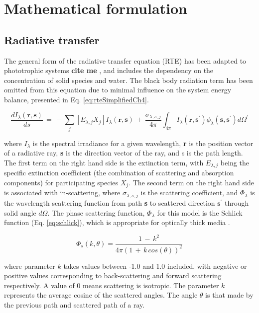 
\newpage
\section{Mathematical formulation}
\label{S:formulation}
\subsection{Radiative transfer}
The general form of the radiative transfer equation (RTE) has been adapted to phototrophic systems \textbf{cite me} \cite{kong2014}, and includes the dependency on the concentration of solid species and water. The black body radiation term has been omitted from this equation due to minimal influence on the system energy balance, presented in Eq. \eqref{eq:rteSimplifiedCh4}. 

\begin{equation}
\frac{dI_\lambda (\textbf{r}, \textbf{s})}{ds} \, = \, - \sum_{j} [E_{\lambda,j} X_j] I_\lambda (\textbf{r}, \textbf{s})\, +\, \frac{\sigma_{\lambda, s, j}}{4 \pi} \int_{4 \pi} I_\lambda (\textbf{r}, \textbf{s}^\prime) \phi_\lambda(\textbf{s}, \textbf{s}^\prime) d\Omega^\prime
\label{eq:rteSimplifiedCh4}
    \end{equation}

where $I_\lambda$ is the spectral irradiance for a given wavelength, \textbf{r} is the position vector of a radiative ray, \textbf{s} is the direction vector of the ray, and s is the path length. The first term on the right hand side is the extinction term, with $E_{\lambda, j}$ being the specific extinction coefficient (the combination of scattering and absorption components) for participating species $X_j$. The second term on the right hand side is associated with in-scattering, where $\sigma_{\lambda, s, j}$ is the scattering coefficient, and $\Phi_\lambda$ is the wavelength scattering function from path \textbf{s} to scattered direction $\textbf{s}^\prime$ through solid angle $d\Omega$. The phase scattering function, $\Phi_\lambda$ for this model is the Schlick function (Eq. \ref{eq:schlick}), which is appropriate for optically thick media \cite{jarosz2008}. 

\begin{equation}
\Phi_s(k, \theta) = \frac{1 \, -\,  k^2}{4\pi (1\, +\,k\, cos(\theta))^2 }
\end{equation}

where parameter $k$ takes values between -1.0 and 1.0 included, with negative or positive values corresponding to back-scattering and forward scattering respectively. A value of 0 means scattering is isotropic. The parameter $k$ represents the average cosine of the scattered angles. The angle $\theta$ is that made by the previous path and scattered path of a ray.

